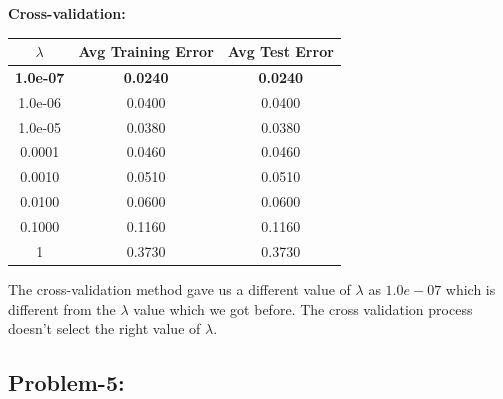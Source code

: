 \documentclass[11pt]{article}
\begin{document}
\begin{flushleft}
\begin{figure}[H]
	\centering
\end{figure}

\textbf{Cross-validation:}
\begin{center}
	\begin{tabular}{||c c c||} 
		\hline
		$\lambda$ & Avg Training Error & Avg Test Error \\ [0.5ex] 
		\hline\hline
		\textbf{1.0e-07} & \textbf{0.0240} &\textbf{ 0.0240} \\
		\hline
		1.0e-06 & 0.0400 & 0.0400 \\
		\hline
		1.0e-05 & 0.0380 & 0.0380 \\
		\hline
		0.0001 & 0.0460 & 0.0460 \\
		\hline
		0.0010 & 0.0510 & 0.0510 \\
		\hline
		0.0100 & 0.0600 & 0.0600 \\
		\hline
		0.1000 & 0.1160 & 0.1160 \\
		\hline
		1 & 0.3730 & 0.3730 \\
		\hline
	\end{tabular}
\end{center}

The cross-validation method gave us a different value of $\lambda$ as $1.0e-07$ which is different from the $\lambda$ value which we got before. The cross validation process doesn't select the right value of $\lambda$.

\pagebreak
\subsection*{Problem-5:}


\end{flushleft}
\end{document}
